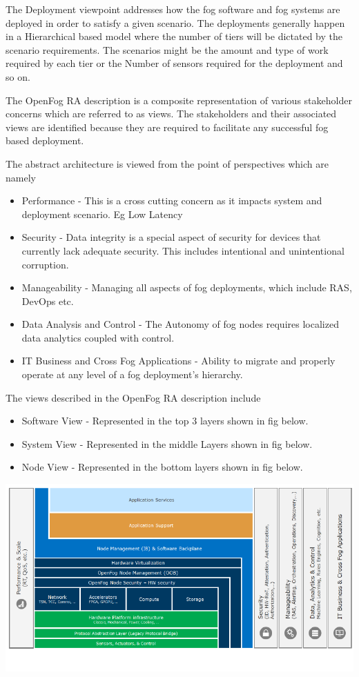 \documentclass{article}
\begin{document}
The Deployment viewpoint addresses how the fog software and fog systems are deployed in order to satisfy a given scenario. The deployments generally happen in a Hierarchical based model where the number of tiers will be dictated by the scenario requirements\cite{openfogconsortium2017}.
The scenarios might be the amount and type of work required by each tier or the Number of sensors required for the deployment and so on.

The OpenFog RA description is a composite representation of various stakeholder concerns which are referred to as views. The stakeholders and their associated views are identified because they are required to facilitate any successful fog based deployment\cite{openfogconsortium2017}. 

The abstract architecture is viewed from the point of perspectives\cite{openfogconsortium2017} which are namely 
\begin{itemize}
\item Performance - This is a cross cutting concern as it impacts system and deployment scenario. Eg Low Latency
\item Security - Data integrity is a special aspect of security for devices that currently lack adequate security. This includes intentional and unintentional corruption.
\item Manageability - Managing all aspects of fog deployments, which include RAS, DevOps etc. 
\item Data Analysis and Control -  The Autonomy of fog nodes requires localized data analytics coupled with control.
\item IT Business and Cross Fog Applications -  Ability to migrate and properly operate at any level of a fog deployment’s hierarchy.  
\end{itemize}

The views\cite{openfogconsortium2017} described in the OpenFog RA description include 
\begin{itemize}
\item Software View - Represented in the top 3 layers shown in fig below.
\item System View - Represented in the middle Layers shown in fig below.
\item Node View - Represented in the bottom layers shown in fig below.
\end{itemize} 

\includegraphics[scale=0.7]{figa.png}
\end{document}
